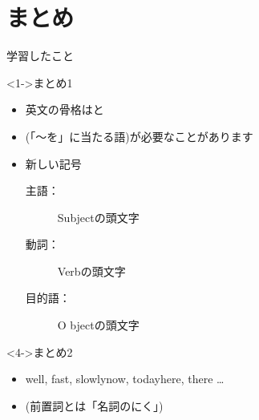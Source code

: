 \documentclass[aspectratio=169,xcolor={dvipsnames,table}]{beamer}
\begin{document}
\section{まとめ}
\begin{frame}[plain]{学習したこと}
\begin{block}<1->{まとめ1}
\begin{itemize}[square]\small
 \item<1-> 英文の骨格はと
 \item<2-> (「～を」に当たる語)が必要なことがあります
 \item<3-> 新しい記号
        \begin{description}
	\item[主語：] S\hfill{ubjectの頭文字} 
	\item[動詞：] V\hfill{erbの頭文字}
	\item[目的語：] O \hfill{bjectの頭文字}
       \end{description}
\end{itemize}
 \end{block}
\begin{block}<4->{まとめ2}\small
{}
\begin{itemize}[square]\small
 \item<5-> %
\hspace{60pt}{\scriptsize 様態：}well, fast, slowly\hspace{15pt}{\scriptsize とき：}now, today\hspace{15pt}{\scriptsize 場所：}here, there \ldots
\item<6-> %
\hspace{20pt}{in, on, with, before, after \ldots}\hfill{\scriptsize  (前置詞とは「名詞のにく」)}
\end{itemize}

\hfill{}
 \end{block}
\end{frame}
\end{document}
